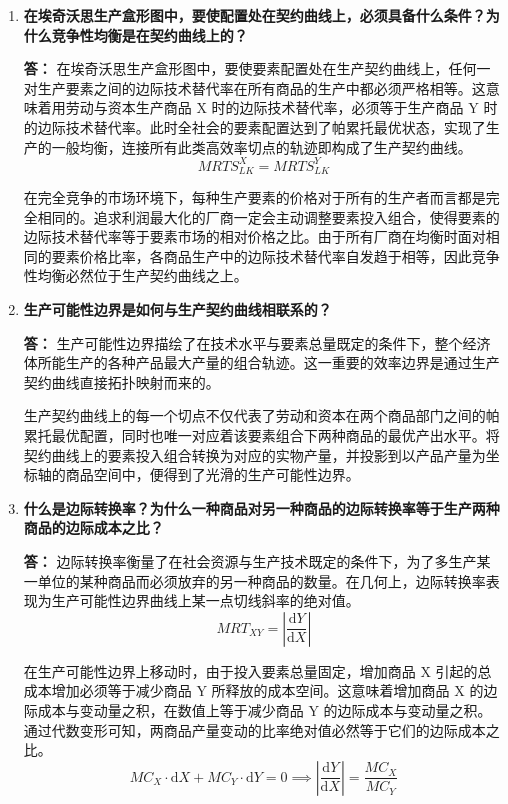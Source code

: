 \begin{enumerate}[label=\textbf{\arabic*.}, leftmargin=*]
\begin{center}
		\end{center}
		
		\item \textbf{在埃奇沃思生产盒形图中，要使配置处在契约曲线上，必须具备什么条件？为什么竞争性均衡是在契约曲线上的？}
		
		\textbf{答：}
		在埃奇沃思生产盒形图中，要使要素配置处在生产契约曲线上，任何一对生产要素之间的边际技术替代率在所有商品的生产中都必须严格相等。这意味着用劳动与资本生产商品 X 时的边际技术替代率，必须等于生产商品 Y 时的边际技术替代率。此时全社会的要素配置达到了帕累托最优状态，实现了生产的一般均衡，连接所有此类高效率切点的轨迹即构成了生产契约曲线。
		\[
		MRTS_{LK}^{X} = MRTS_{LK}^{Y}
		\]
		
		在完全竞争的市场环境下，每种生产要素的价格对于所有的生产者而言都是完全相同的。追求利润最大化的厂商一定会主动调整要素投入组合，使得要素的边际技术替代率等于要素市场的相对价格之比。由于所有厂商在均衡时面对相同的要素价格比率，各商品生产中的边际技术替代率自发趋于相等，因此竞争性均衡必然位于生产契约曲线之上。
		
		\item \textbf{生产可能性边界是如何与生产契约曲线相联系的？}
		
		\textbf{答：}
		生产可能性边界描绘了在技术水平与要素总量既定的条件下，整个经济体所能生产的各种产品最大产量的组合轨迹。这一重要的效率边界是通过生产契约曲线直接拓扑映射而来的。
		
		生产契约曲线上的每一个切点不仅代表了劳动和资本在两个商品部门之间的帕累托最优配置，同时也唯一对应着该要素组合下两种商品的最优产出水平。将契约曲线上的要素投入组合转换为对应的实物产量，并投影到以产品产量为坐标轴的商品空间中，便得到了光滑的生产可能性边界。
		
		\item \textbf{什么是边际转换率？为什么一种商品对另一种商品的边际转换率等于生产两种商品的边际成本之比？}
		
		\textbf{答：}
		边际转换率衡量了在社会资源与生产技术既定的条件下，为了多生产某一单位的某种商品而必须放弃的另一种商品的数量。在几何上，边际转换率表现为生产可能性边界曲线上某一点切线斜率的绝对值。
		\[
		MRT_{XY} = \left| \frac{\mathrm{d}Y}{\mathrm{d}X} \right|
		\]
		
		在生产可能性边界上移动时，由于投入要素总量固定，增加商品 X 引起的总成本增加必须等于减少商品 Y 所释放的成本空间。这意味着增加商品 X 的边际成本与变动量之积，在数值上等于减少商品 Y 的边际成本与变动量之积。通过代数变形可知，两商品产量变动的比率绝对值必然等于它们的边际成本之比。
		\[
		MC_X \cdot \mathrm{d}X + MC_Y \cdot \mathrm{d}Y = 0 \implies \left| \frac{\mathrm{d}Y}{\mathrm{d}X} \right| = \frac{MC_X}{MC_Y}
		\]
		

\end{enumerate}
